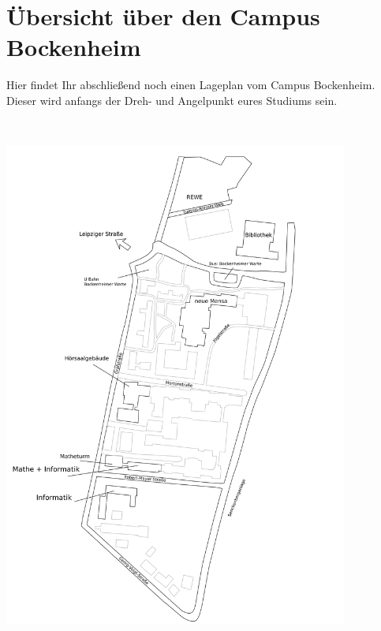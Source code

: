 \documentclass[a4paper,12pt]{scrartcl}
\begin{document}



\section{Übersicht über den Campus Bockenheim}


Hier findet Ihr abschließend noch einen Lageplan vom Campus Bockenheim. Dieser wird anfangs der Dreh- und Angelpunkt eures Studiums sein.


~
\thispagestyle{empty}
\begin{center}
\includegraphics[width=0.85\textwidth]{bitmaps/KarteB}
\end{center}
\newpage
\end{document}

